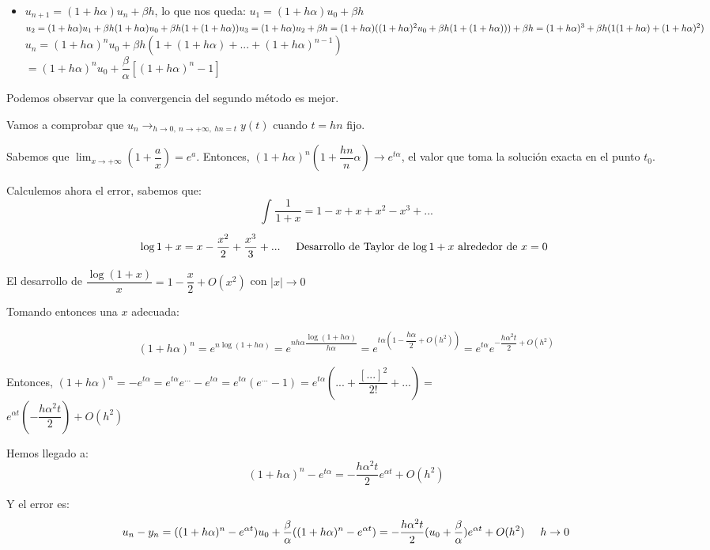 \documentclass[openany]{book}
\begin{document}
\begin{exercise}
\begin{itemize}
            \item $ u_{n+1} = (1+h \alpha ) u_n+\beta h $, lo que nos queda:
                $ u_1 = (1+h \alpha ) u_0 + \beta h $\\ $ u_2 = (1+h \alpha )u_1+\beta h (1+h \alpha )u_0+ \beta h(1+(1+h \alpha))\\ u_3 = (1+h \alpha )u_2 + \beta h = (1+h \alpha) ((1+h \alpha)^2 u_0 + \beta h (1+(1+h \alpha))) + \beta h = (1+h \alpha) ^3 + \beta h(1(1+h \alpha )+ (1+h \alpha )^2) $\\
                $ u_n = (1+ h \alpha) ^{n} u_0 + \beta h (1+(1+h \alpha)+...+(1+h \alpha )^{n-1}) $\\
                $   = (1+h \alpha ) ^{n}u_0+ \dfrac{\beta}{\alpha}[(1+h \alpha )^{n}-1] $
        \end{itemize}
        
        Podemos observar que la convergencia del segundo método es mejor.

        Vamos a comprobar que $ u_n \to_{h \to 0,\ n \to +\infty,\ hn = t} y(t) $ cuando $ t = hn $ fijo.

        Sabemos que $ \lim_{x \to +\infty} \left(1+\dfrac{a}{x}\right) = e^{a} $. Entonces, $ (1+h \alpha)^{n} (1+\dfrac{h n}{n}\alpha) \to e ^{t \alpha}$, el valor que toma la solución exacta en el punto $ t_0 $.

        Calculemos ahora el error, sabemos que:
        $$ \int_{}^{} \dfrac{1}{1+x} = 1-x+x+x ^2-x^3 +... $$
        $$ \log{1+x} = x-\dfrac{x^2}{2} + \dfrac{x^3}{3}+... \hspace{5mm} \text{Desarrollo de Taylor de $ \log{1+x} $ alrededor de $ x=0 $ } $$
        
        El desarrollo de $ \dfrac{\log{(1+x)}}{x} = 1-\dfrac{x}{2}+O(x^2) $ con $ |x| \to 0 $

        Tomando entonces una $ x $ adecuada:

        $$ (1+h \alpha) ^{n} = e ^{n \log{(1+h \alpha)}} = e ^{n h \alpha \dfrac{\log{(1+h \alpha)}}{h \alpha}} = e ^{t \alpha (1- \dfrac{h \alpha}{2}+O(h^2))} = e ^{t \alpha }e^{-\dfrac{h \alpha ^2 t}{2}+ O(h^2)}$$

        Entonces, $ (1+h \alpha )^{n} = -e^{t \alpha} = e^{t \alpha} e^{...}-e^{t \alpha} = e^{t \alpha}(e ^{...}-1) = e ^{t \alpha }(... + \dfrac{[...]^2}{2!}+...) = $\\
        $ e ^{\alpha t} (-\dfrac{h \alpha ^2 t}{2}) + O(h^2) $

        Hemos llegado a:
        $$ (1+h \alpha) ^{n} - e^{t \alpha} = -\dfrac{h \alpha ^2 t}{2} e ^{\alpha t} + O(h ^2) $$
        
        Y el error es:
        $$ u_n-y_n = ((1+ h \alpha) ^{n}- e ^{ \alpha t})u_0 + \dfrac{\beta}{\alpha}((1+h \alpha)^{n}- e ^{\alpha t}) = -\dfrac{h \alpha ^2 t}{2}(u_0+ \dfrac{\beta}{\alpha}) e ^{\alpha t}+ O(h ^2)\hspace{5mm}h \to 0$$



        

    \end{exercise}
\end{document}
